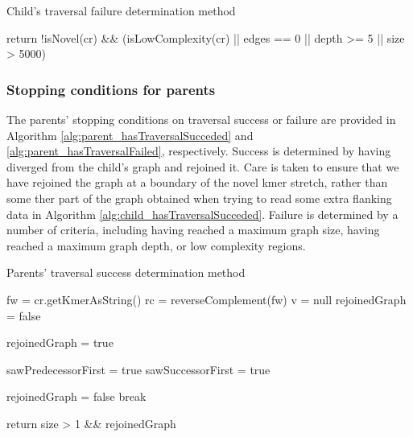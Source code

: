 \begin{algorithm}
\caption{Child's traversal failure determination method}
\label{alg:child_hasTraversalFailed}
\begin{algorithmic}[1]
    \State return !isNovel(cr) \&\& (isLowComplexity(cr) || edges == 0 || depth >= 5 || size > 5000)
\EndFunction
\end{algorithmic}
\end{algorithm}

\subsubsection{Stopping conditions for parents}

The parents' stopping conditions on traversal success or failure are provided in Algorithm \ref{alg:parent_hasTraversalSucceded} and \ref{alg:parent_hasTraversalFailed}, respectively.  Success is determined by having diverged from the child's graph and rejoined it.  Care is taken to ensure that we have rejoined the graph at a boundary of the novel kmer stretch, rather than some ther part of the graph obtained when trying to read some extra flanking data in Algorithm \ref{alg:child_hasTraversalSucceded}.  Failure is determined by a number of criteria, including having reached a maximum graph size, having reached a maximum graph depth, or low complexity regions.

\begin{algorithm}
\caption{Parents' traversal success determination method}
\label{alg:parent_hasTraversalSucceded}
\begin{algorithmic}[1]
    \State fw = cr.getKmerAsString()
    \State rc = reverseComplement(fw)
    \State v = null
    \State rejoinedGraph = false

        \State rejoinedGraph = true

                        sawPredecessorFirst = true 
                        sawSuccessorFirst = true 
                    \EndIf
                \EndIf

                    \State rejoinedGraph = false
                    \State break
                \EndIf
            \EndIf
        \EndFor
    \EndIf

    \State return size > 1 \&\& rejoinedGraph
\EndFunction
\end{algorithmic}
\end{algorithm}

